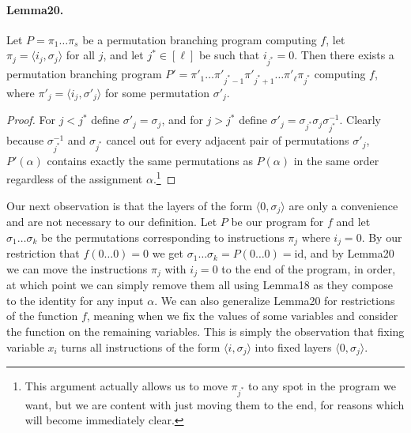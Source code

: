 \paragraph{Lemma20.} Let $P=\pi_1\ldots\pi_s$ be a permutation branching program computing $f$, let $\pi_j=\langle i_j,\sigma_j\rangle$ for all $j$, and let $j^*\in[\ell]$ be such that $i_{j^*}=0$. Then there exists a permutation branching program $P'=\pi'_1\ldots\pi'_{j^*-1}\pi'_{j^*+1}\ldots\pi'_{\ell}\pi_{j^*}$ computing $f$, where $\pi'_j=\langle i_j,\sigma'_j\rangle$ for some permutation $\sigma'_j$.
\begin{proof}
For $j<j^*$ define $\sigma'_j=\sigma_j$, and for $j>j^*$ define $\sigma'_j=\sigma_{j^*}\sigma_j\sigma_{j^*}^{-1}$. Clearly because $\sigma_{j^*}^{-1}$ and $\sigma_{j^*}$ cancel out for every adjacent pair of permutations $\sigma'_j$, $P'(\alpha)$ contains exactly the same permutations as $P(\alpha)$ in the same order regardless of the assignment $\alpha$.\footnote{This argument actually allows us to move $\pi_{j^*}$ to any spot in the program we want, but we are content with just moving them to the end, for reasons which will become immediately clear.}
\end{proof}
Our next observation is that the layers of the form $\langle0,\sigma_j\rangle$ are only a convenience and are not necessary to our definition. Let $P$ be our program for $f$ and let $\sigma_1\ldots\sigma_k$ be the permutations corresponding to instructions $\pi_j$ where $i_j=0$. By our restriction that $f(0\ldots0)=0$ we get $\sigma_1\ldots\sigma_k=P(0\ldots0)=\mathrm{id}$, and by Lemma20 we can move the instructions $\pi_j$ with $i_j=0$ to the end of the program, in order, at which point we can simply remove them all using Lemma18 as they compose to the identity for any input $\alpha$.
We can also generalize Lemma20 for restrictions of the function $f$, meaning when we fix the values of some variables and consider the function on the remaining variables. This is simply the observation that fixing variable $x_i$ turns all instructions of the form $\langle i,\sigma_j\rangle$ into fixed layers $\langle0,\sigma_j\rangle$.
